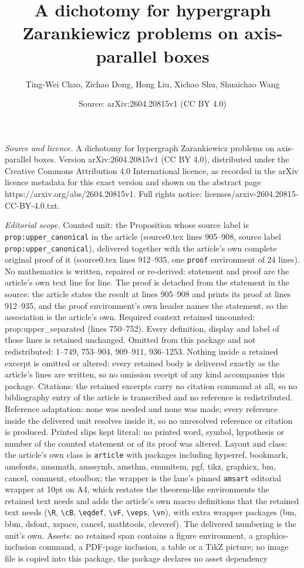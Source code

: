 \documentclass[10pt,a4paper]{amsart}
\title[A dichotomy for hypergraph Zarankiewicz problems on axis-par]{A dichotomy for hypergraph Zarankiewicz problems on axis-parallel boxes}
\author{Ting-Wei Chao, Zichao Dong, Hong Liu, Xichao Shu, Shuaichao Wang}
\date{Source: arXiv:2604.20815v1 (CC BY 4.0)}
\begin{document}
\maketitle

\noindent\emph{Source and licence.} A dichotomy for hypergraph Zarankiewicz problems on axis-parallel boxes. Version arXiv:2604.20815v1 (CC BY 4.0), distributed under the Creative Commons Attribution 4.0 International licence, as recorded in the arXiv licence metadata for this exact version and shown on the abstract page https://arxiv.org/abs/2604.20815v1. Full rights notice: licenses/arxiv-2604.20815-CC-BY-4.0.txt.\par\smallskip

\noindent\textit{Editorial scope.} Counted unit: the Proposition whose source label is \texttt{prop:upper\_canonical} in the article (source0.tex lines 905--908, source label \texttt{prop:upper\_canonical}), delivered together with the article's own complete original proof of it (source0.tex lines 912--935, one \texttt{proof} environment of 24 lines). No mathematics is written, repaired or re-derived: statement and proof are the article's own text line for line. The proof is detached from the statement in the source: the article states the result at lines 905--908 and prints its proof at lines 912--935, and the proof environment's own header names the statement, so the association is the article's own. Required context retained uncounted: prop:upper\_separated (lines 750--752). Every definition, display and label of those lines is retained unchanged. Omitted from this package and not redistributed: 1--749, 753--904, 909--911, 936--1253. Nothing inside a retained excerpt is omitted or altered: every retained body is delivered exactly as the article's lines are written, so no omission receipt of any kind accompanies this package. Citations: the retained excerpts carry no citation command at all, so no bibliography entry of the article is transcribed and no reference is redistributed. Reference adaptation: none was needed and none was made; every reference inside the delivered unit resolves inside it, so no unresolved reference or citation is produced. Printed slips kept literal: no printed word, symbol, hypothesis or number of the counted statement or of its proof was altered. Layout and class: the article's own class is \texttt{article} with packages including hyperref, bookmark, amsfonts, amsmath, amssymb, amsthm, enumitem, pgf, tikz, graphicx, bm, cancel, comment, etoolbox; the wrapper is the lane's pinned \texttt{amsart} editorial wrapper at 10pt on A4, which restates the theorem-like environments the retained text needs and adds the article's own macro definitions that the retained text needs (\texttt{\textbackslash R}, \texttt{\textbackslash cB}, \texttt{\textbackslash eqdef}, \texttt{\textbackslash vF}, \texttt{\textbackslash veps}, \texttt{\textbackslash vn}), with extra wrapper packages (bm, bbm, dsfont, xspace, cancel, mathtools, cleveref). The delivered numbering is the unit's own. Assets: no retained span contains a figure environment, a graphics-inclusion command, a PDF-page inclusion, a table or a TikZ picture; no image file is copied into this package, the package declares no asset dependency 
\end{document}
